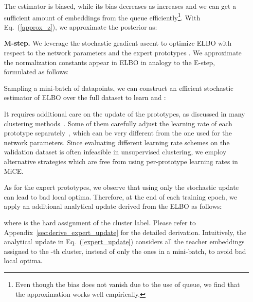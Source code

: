 \documentclass{article} \usepackage{iclr2021_conference,times}
\begin{document}
The estimator is biased, while its bias decreases as  increases and we can get a sufficient amount of embeddings from the queue  efficiently\footnote{Even though the bias does not vanish due to the use of queue, we find that the approximation works well empirically.}.
With Eq.~(\ref{approx_z}), we approximate the posterior as:


















{\bf M-step.} We leverage the stochastic gradient ascent to optimize ELBO with respect to the network parameters  and the expert prototypes . We approximate the normalization constants appear in ELBO in analogy to the E-step, formulated as follows:

Sampling a mini-batch  of datapoints, we can construct an efficient stochastic estimator of ELBO over the full dataset to learn  and :

It requires additional care on the update of the prototypes, as discussed in many clustering methods~\citep{sculley2010web-scale,xie2016unsupervised,yang2017towards,shiran2019multi}. Some of them carefully adjust the learning rate of each prototype separately~\citep{sculley2010web-scale,yang2017towards}, which can be very different from the one used for the network parameters. Since evaluating different learning rate schemes on the validation dataset is often infeasible in unsupervised clustering, we employ alternative strategies which are free from using per-prototype learning rates in MiCE.

As for the expert prototypes, we observe that using only the stochastic update can lead to bad local optima. Therefore, at the end of each training epoch, we apply an additional analytical update derived from the ELBO as follows: 

where   is the hard assignment of the cluster label.
Please refer to Appendix~\ref{sec:derive_expert_update} for the detailed derivation.
Intuitively, the analytical update in Eq.~(\ref{expert_update}) considers all the teacher embeddings assigned to the -th cluster, instead of only the ones in a mini-batch, to avoid bad local optima.
\end{document}
